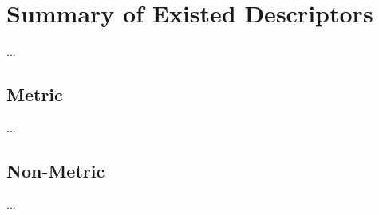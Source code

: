 \section{Summary of Existed Descriptors}


...



\subsection{Metric}



...



\subsection{Non-Metric}


...



